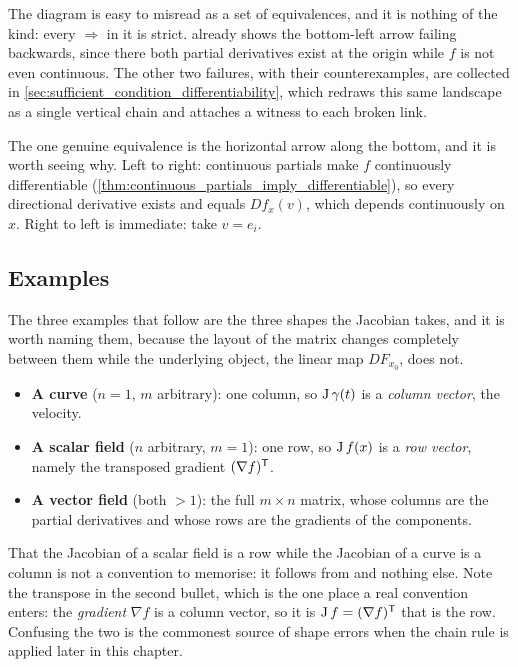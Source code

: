 \begin{importantremark}
The diagram is easy to misread as a set of equivalences, and it is nothing of the kind: every
$\Rightarrow$ in it is strict.  already shows the
bottom-left arrow failing backwards, since there both partial derivatives exist at the origin
while $f$ is not even continuous. The other two failures, with their counterexamples, are collected in
\cref{sec:sufficient_condition_differentiability}, which redraws this same landscape as a single
vertical chain and attaches a witness to each broken link.

The one genuine equivalence is the horizontal arrow along the bottom, and it is worth seeing
why. Left to right: continuous partials make $f$ continuously differentiable
(\cref{thm:continuous_partials_imply_differentiable}), so every directional derivative exists
and equals $Df_x(v)$, which depends continuously on $x$. Right to left is immediate: take
$v = e_i$.
\end{importantremark}

\subsection{Examples}

The three examples that follow are the three shapes the Jacobian takes, and it is worth naming
them, because the layout of the matrix changes completely between them while the underlying
object, the linear map $DF_{x_0}$, does not.
\begin{itemize}
  \item \textbf{A curve} ($n=1$, $m$ arbitrary): one column, so $\operatorname{J}\gamma(t)$ is a
    \emph{column vector}, the velocity.
  \item \textbf{A scalar field} ($n$ arbitrary, $m=1$): one row, so $\operatorname{J} f(x)$ is a
    \emph{row vector}, namely the transposed gradient $(\nabla f)^{\mathsf{T}}$.
  \item \textbf{A vector field} (both $>1$): the full $m \times n$ matrix, whose columns are the
    partial derivatives and whose rows are the gradients of the components.
\end{itemize}
That the Jacobian of a scalar field is a row while the Jacobian of a curve is a column is not a
convention to memorise: it follows from  and nothing else. Note the
transpose in the second bullet, which is the one place a real convention enters: the
\emph{gradient} $\nabla f$ is a column vector, so it is $\operatorname{J} f = (\nabla f)^{\mathsf{T}}$ that is the
row. Confusing the two is the commonest source of shape errors when the chain rule is applied
later in this chapter.

